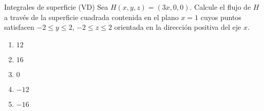 \documentclass[notheorems]{beamer}
\begin{document}
\begin{frame}{Integrales de superficie (VD)}
Sea $H(x,y,z)=(3x,0,0)$. Calcule el flujo de $H$ a trav\'es de la superficie cuadrada contenida en el plano $x=1$ cuyos puntos satisfacen $-2\leq y\leq 2$, $-2\leq z\leq 2$ orientada en la direcci\'on positiva del eje $x$. 

\begin{enumerate}
\item $12$
\item $16$ 
\item $0$
\item $-12$
\item $-16$
\end{enumerate}

\end{frame}
\end{document}

